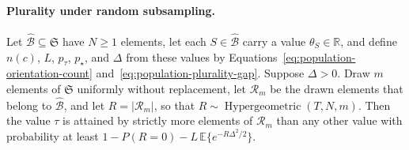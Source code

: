 \paragraph[Plurality under random subsampling.]{ Plurality under random subsampling.}
\begin{lemma}
\label{lem:random-subsampling-plurality}
\normalfont

Let $\widehat{\mathcal B}\subseteq\mathfrak S$ have $N\ge1$ elements, let each $S\in\widehat{\mathcal B}$ carry a value $\theta_S\in\mathbb R$, and define $n(c)$, $L$, $p_\tau$, $p_\star$, and $\Delta$ from these values by Equations~\eqref{eq:population-orientation-count} and~\eqref{eq:population-plurality-gap}. Suppose $\Delta>0$. Draw $m$ elements of $\mathfrak S$ uniformly without replacement, let $\mathcal R_m$ be the drawn elements that belong to $\widehat{\mathcal B}$, and let $R=|\mathcal R_m|$, so that $R\sim\operatorname{Hypergeometric}(T,N,m)$. Then the value $\tau$ is attained by strictly more elements of $\mathcal R_m$ than any other value with probability at least $1-P(R=0)-L\,\mathbb E\{e^{-R\Delta^2/2}\}$.

\end{lemma}
